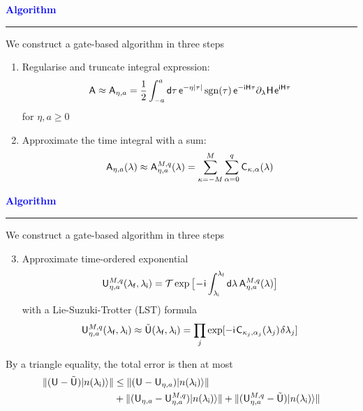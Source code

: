 \documentclass{beamer}
\def\gemph#1{{\color{mygreen}#1}}
\def\lbt{} %
\DeclareMathOperator{\sgn}{sgn}
\def\mt#1{\kern0.025em\mathsf{#1}\kern0.025em}
\def\d{\mathsf d}
\def\e{\mathsf e}
\def\i{\mathsf i}
\def\lambdai{{\lambda_{\sf i}}}
\def\lambdaf{{\lambda_{\sf f}}}
\def\A{\mt A}
\def\H{\mt H}
\def\+{\kern0.0833em}
\def\>{\kern0.08em}
\newenvironment{dia}[2]
{
	\begin{frame}
	\vspace{1mm}
	{\small #1}
	\hfill
    {\small\bf\textcolor{blue}{#2}}
	\vspace{3mm}
	\hrule
	\bigskip
}
{
	\vfill
	\end{frame}
}
\begin{document}
\begin{dia}{\lbt}{Algorithm}
We construct a gate-based algorithm in three steps \pause
\begin{enumerate}
    \item \gemph{Regularise} and \gemph{truncate} integral expression:
    \begin{align*}
        \A \approx \A_{\eta, a} = \frac12 \int_{-a}^a \d\tau \, \e^{-\eta|\tau|} \sgn(\tau) \, \e^{-\i\H\tau} \partial_\lambda \H \+ \e^{\i\H\tau}
    \end{align*}
    for $\eta, a \geq 0$ \pause
    \item Approximate the time integral with a \gemph{sum}:
    \begin{align*}
        \A_{\eta, a}(\lambda) \approx \A_{\eta, a}^{M, q}(\lambda) = \sum_{\kappa = -M}^M \sum_{\alpha = 0}^q \mt C_{\kappa, \alpha}(\lambda)
    \end{align*}
\end{enumerate}
\vspace{0.65cm}
\end{dia}

\begin{dia}{\lbt}{Algorithm}
We construct a gate-based algorithm in three steps
\begin{enumerate}
    \setcounter{enumi}{2}
    \item Approximate time-ordered exponential
    \begin{align*}
        \mt U_{\eta, a}^{M, q}(\lambdaf, \lambdai) = \mathcal T \exp\big[ \!-\!\i \int_\lambdai^\lambdaf \d\lambda \, \A_{\eta, a}^{M, q}(\lambda) \big]
    \end{align*}
    with a \gemph{Lie-Suzuki-Trotter} (LST) formula
    \begin{align*}
        \mt U_{\eta, a}^{M, q}(\lambdaf, \lambdai) \approx \tilde{\mt U}(\lambdaf, \lambdai) = \prod_j \exp[-\i \> \mt C_{\kappa_j, \alpha_j}(\lambda_j) \> \delta\lambda_j]
    \end{align*}
\end{enumerate} \pause
By a triangle equality, the total error is then at most
\begin{align*}
    \|(\mt U - \tilde{\mt U})\ket{n(\lambdai)}\| &\leq \|(\mt U - \mt U_{\eta, a})\ket{n(\lambdai)}\| \\
    &+ \|(\mt U_{\eta, a} - \mt U_{\eta, a}^{M, q})\ket{n(\lambdai)}\| + \|(\mt U_{\eta, a}^{M, q} - \tilde{\mt U})\ket{n(\lambdai)}\|
\end{align*}
\vspace{-1cm}
\end{dia}
\end{document}

